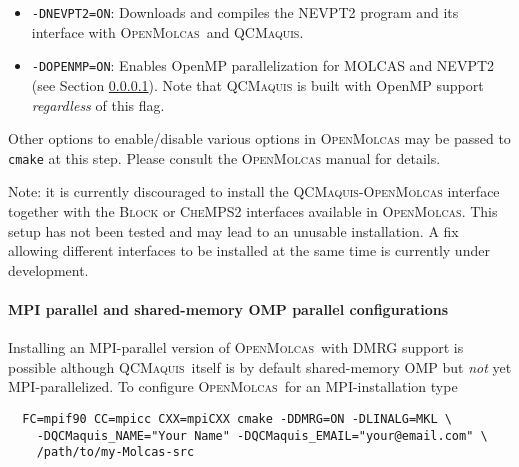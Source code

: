 \documentclass[bibliography=totoc,12pt,a4paper]{scrartcl}
\newcommand{\mol}{\textsc{OpenMolcas}}
\newcommand{\qcm}{\textsc{QCMaquis}}
\begin{document}
\begin{itemize}
 \item \texttt{-DNEVPT2=ON}: Downloads and compiles the NEVPT2 program and its interface with \mol\ and \qcm.
 \item \texttt{-DOPENMP=ON}: Enables OpenMP parallelization for MOLCAS and NEVPT2 (see Section \ref{sec:parallel}).
       Note that \qcm{} is built with OpenMP support \emph{regardless} of this flag.
\end{itemize}

Other options to enable/disable various options in \mol{} may be passed to \texttt{cmake} at this step. Please consult the \mol{} manual for details.


\begin{framed}
  \noindent Note: it is currently discouraged to install the \qcm{}-\mol{} interface together with the \textsc{Block} or \textsc{CheMPS2} interfaces available in \mol{}.
  This setup has not been tested and may lead to an unusable installation.
  A fix allowing different interfaces to be installed at the same time is currently under development.
\end{framed}

\paragraph{MPI parallel and shared-memory OMP parallel configurations}\label{sec:parallel}$\;$\\

\noindent Installing an MPI-parallel version of \mol\ with DMRG support is possible although \qcm\ itself is by default shared-memory OMP but \emph{not} yet MPI-parallelized.
To configure \mol\ for an MPI-installation type

\begin{verbatim}
  FC=mpif90 CC=mpicc CXX=mpiCXX cmake -DDMRG=ON -DLINALG=MKL \
    -DQCMaquis_NAME="Your Name" -DQCMaquis_EMAIL="your@email.com" \
    /path/to/my-Molcas-src
\end{verbatim}
\end{document}
